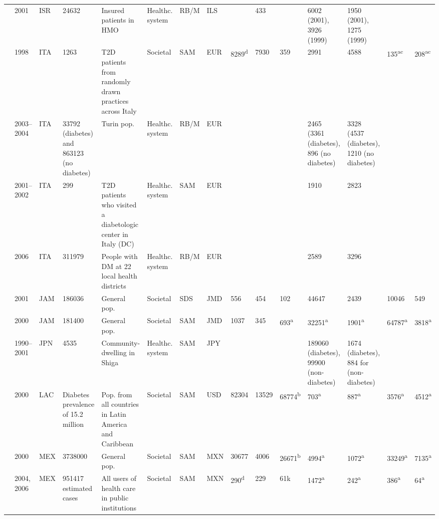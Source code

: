 \documentclass[12pt,english]{article}
\begin{document}
\begin{appendix}
\begin{landscape}
\begin{tabularx}{\linewidth}{Z X X Z Z X X X X X X X X Y Y}
\textcite{Chodick2005a} & 2001 & ISR & 24632 & Insured patients in HMO & Healthc. system & RB/M & ILS &  & 433 &  & 6002 (2001), 3926 (1999) & 1950 (2001), 1275 (1999) &  &  \\
\textcite{Lucioni2003} & 1998 & ITA & 1263 & T2D patients from randomly drawn practices   across Italy & Societal & SAM & EUR & 8289\textsuperscript{d} & 7930 & 359 & 2991 & 4588 & 135\textsuperscript{ac} & 208\textsuperscript{ac} \\
\textcite{Bruno2012} & 2003--2004 & ITA & 33792 (diabetes) and 863123 (no diabetes) & Turin pop. & Healthc. system & RB/M & EUR &  &  &  & 2465 (3361 (diabetes), 896 (no diabetes) & 3328 (4537 (diabetes), 1210 (no diabetes) &  &  \\
\textcite{Morsanutto2006b} & 2001--2002 & ITA & 299 & T2D patients who visited a diabetologic   center in Italy (DC) & Healthc. system & SAM & EUR &  &  &  & 1910 & 2823 &  &  \\
\textcite{Marchesini2011b} & 2006 & ITA & 311979 & People with DM at 22 local health districts & Healthc. system & RB/M & EUR &  &  &  & 2589 & 3296 &  &  \\
\textcite{Abdulkadri2009b} & 2001 & JAM & 186036 & General pop. & Societal & SDS & JMD & 556 & 454 & 102 & 44647 & 2439 & 10046 & 549 \\
\textcite{Barcelo2003} & 2000 & JAM & 181400 & General pop. & Societal & SAM & JMD & 1037 & 345 & 693\textsuperscript{a} & 32251\textsuperscript{a} & 1901\textsuperscript{a} & 64787\textsuperscript{a} & 3818\textsuperscript{a} \\
\textcite{Nakamura2008} & 1990--2001 & JPN & 4535 & Community-dwelling in Shiga & Healthc. system & SAM & JPY &  &  &  & 189060 (diabetes), 99900 (non-diabetes) & 1674 (diabetes), 884 for (non-diabetes) &  &  \\
\textcite{Barcelo2003} & 2000 & LAC & Diabetes prevalence of 15.2 million & Pop. from all countries in Latin America   and Caribbean & Societal & SAM & USD & 82304 & 13529 & 68774\textsuperscript{b} & 703\textsuperscript{a} & 887\textsuperscript{a} & 3576\textsuperscript{a} & 4512\textsuperscript{a} \\
\textcite{Barcelo2003} & 2000 & MEX & 3738000 & General pop. & Societal & SAM & MXN & 30677 & 4006 & 26671\textsuperscript{b} & 4994\textsuperscript{a} & 1072\textsuperscript{a} & 33249\textsuperscript{a} & 7135\textsuperscript{a} \\
\textcite{Arredondo2005a} & 2004, 2006 & MEX & 951417 estimated cases & All users of health care in public   institutions & Societal & SAM & MXN & 290\textsuperscript{d} & 229 & 61k & 1472\textsuperscript{a} & 242\textsuperscript{a} & 386\textsuperscript{a} & 64\textsuperscript{a} \\

\end{tabularx}
\end{landscape}
\end{appendix}
\end{document}
